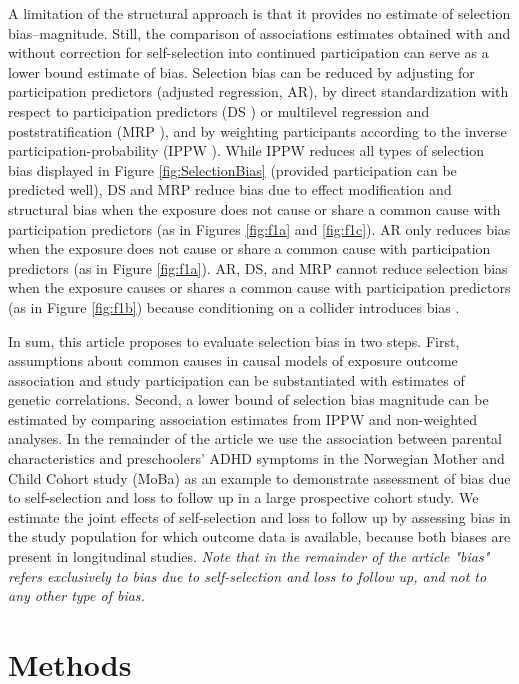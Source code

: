 \documentclass[12pt]{article}
\begin{document}
A limitation of the structural approach is that it provides no estimate of selection bias--magnitude. Still, the comparison of associations estimates obtained with and without correction for self-selection into continued participation can serve as a lower bound estimate of bias. Selection bias can be reduced by adjusting for participation predictors (adjusted regression, AR), by direct standardization with respect to participation predictors (DS \cite{Miettinen1972-vf}) or multilevel regression and poststratification (MRP \cite{Downes2018-oa}), and by weighting participants according to the inverse participation-probability (IPPW \cite{Seaman2013-rj}). While IPPW reduces all types of selection bias displayed in Figure \ref{fig:SelectionBias} (provided participation can be predicted well), DS and MRP reduce bias due to effect modification and structural bias when the exposure does not cause or share a common cause with participation predictors (as in Figures \ref{fig:f1a} and \ref{fig:f1c}). AR only reduces bias when the exposure does not cause or share a common cause with participation predictors (as in Figure \ref{fig:f1a}). AR, DS, and MRP cannot reduce selection bias when the exposure causes or shares a common cause with participation predictors (as in Figure \ref{fig:f1b}) because conditioning on a collider introduces bias \cite{Cole2010-za}.

In sum, this article proposes to evaluate selection bias in two steps. First, assumptions about common causes in causal models of exposure outcome association and study participation can be substantiated with estimates of genetic correlations. Second, a lower bound of selection bias magnitude can be estimated by comparing association estimates from IPPW and non-weighted analyses. In the remainder of the article we use the association between parental characteristics and preschoolers' ADHD symptoms in the Norwegian Mother and Child Cohort study (MoBa) as an example to demonstrate assessment of bias due to self-selection and loss to follow up in a large prospective cohort study. We estimate the joint effects of self-selection and loss to follow up by assessing bias in the study population for which outcome data is available, because both biases are present in longitudinal studies. \emph{Note that in the remainder of the article "bias" refers exclusively to bias due to self-selection and loss to follow up, and not to any other type of bias.}

\section{Methods}
\end{document}
